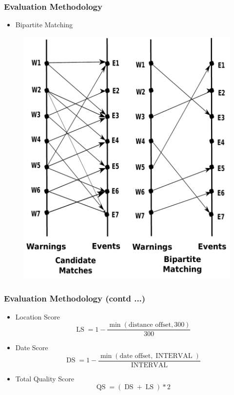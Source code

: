\documentclass[red,handout]{beamer}
\begin{document}
\begin{frame}
\frametitle{Evaluation Methodology}
    \begin{itemize}
        \item
            Bipartite Matching
    \end{itemize}
    \begin{figure}
        \includegraphics[height=0.7\textheight]{matching}
    \end{figure}

\end{frame}

\begin{frame}
    \frametitle{Evaluation Methodology (contd ...)}
    \begin{itemize}
        \item<2->
            Location Score
            \begin{equation*}
                \operatorname{LS}=1 - \frac{\min(\textrm{distance offset}, 300)}{300}
            \end{equation*}
        \item<3->
            Date Score
            \begin{equation*}
                \operatorname{DS}=1 - \frac{\min(\textrm{date offset}, \operatorname{INTERVAL})}{\operatorname{INTERVAL}}
            \end{equation*}

        \item<1->
            Total Quality Score
            \begin{equation*}
                \operatorname{QS}=(\operatorname{DS} + \operatorname{LS})*2
            \end{equation*}
    \end{itemize}
\end{frame}
\end{document}
